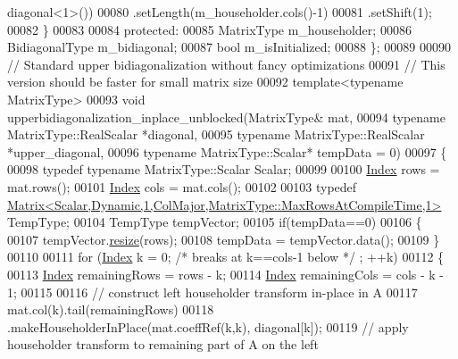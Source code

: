 \begin{DoxyCode}
      diagonal<1>())
00080              .setLength(m\_householder.cols()-1)
00081              .setShift(1);
00082     \}
00083     
00084   \textcolor{keyword}{protected}:
00085     MatrixType m\_householder;
00086     BidiagonalType m\_bidiagonal;
00087     \textcolor{keywordtype}{bool} m\_isInitialized;
00088 \};
00089 
00090 \textcolor{comment}{// Standard upper bidiagonalization without fancy optimizations}
00091 \textcolor{comment}{// This version should be faster for small matrix size}
00092 \textcolor{keyword}{template}<\textcolor{keyword}{typename} MatrixType>
00093 \textcolor{keywordtype}{void} upperbidiagonalization\_inplace\_unblocked(MatrixType& mat,
00094                                               \textcolor{keyword}{typename} MatrixType::RealScalar *diagonal,
00095                                               \textcolor{keyword}{typename} MatrixType::RealScalar *upper\_diagonal,
00096                                               \textcolor{keyword}{typename} MatrixType::Scalar* tempData = 0)
00097 \{
00098   \textcolor{keyword}{typedef} \textcolor{keyword}{typename} MatrixType::Scalar Scalar;
00099 
00100   \hyperlink{class_eigen_1_1internal_1_1_upper_bidiagonalization_adcb14f3919a3dcc9977ba6b8105087fe}{Index} rows = mat.rows();
00101   \hyperlink{class_eigen_1_1internal_1_1_upper_bidiagonalization_adcb14f3919a3dcc9977ba6b8105087fe}{Index} cols = mat.cols();
00102 
00103   \textcolor{keyword}{typedef} \hyperlink{group___core___module_class_eigen_1_1_matrix}{Matrix<Scalar,Dynamic,1,ColMajor,MatrixType::MaxRowsAtCompileTime,1>}
       TempType;
00104   TempType tempVector;
00105   \textcolor{keywordflow}{if}(tempData==0)
00106   \{
00107     tempVector.\hyperlink{class_eigen_1_1_plain_object_base_a99d9054ee2d5a40c6e00ded0265e9cea}{resize}(rows);
00108     tempData = tempVector.data();
00109   \}
00110 
00111   \textcolor{keywordflow}{for} (\hyperlink{class_eigen_1_1internal_1_1_upper_bidiagonalization_adcb14f3919a3dcc9977ba6b8105087fe}{Index} k = 0; \textcolor{comment}{/* breaks at k==cols-1 below */} ; ++k)
00112   \{
00113     \hyperlink{class_eigen_1_1internal_1_1_upper_bidiagonalization_adcb14f3919a3dcc9977ba6b8105087fe}{Index} remainingRows = rows - k;
00114     \hyperlink{class_eigen_1_1internal_1_1_upper_bidiagonalization_adcb14f3919a3dcc9977ba6b8105087fe}{Index} remainingCols = cols - k - 1;
00115 
00116     \textcolor{comment}{// construct left householder transform in-place in A}
00117     mat.col(k).tail(remainingRows)
00118        .makeHouseholderInPlace(mat.coeffRef(k,k), diagonal[k]);
00119     \textcolor{comment}{// apply householder transform to remaining part of A on the left}

\end{DoxyCode}
